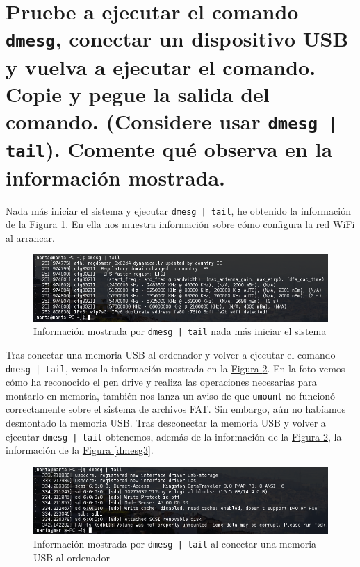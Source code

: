 \documentclass[10pt,a4paper,spanish]{article}
\numberwithin{equation}{section} %
\numberwithin{figure}{section} %
\numberwithin{table}{section} %
\begin{document}
\section{Pruebe a ejecutar el comando \texttt{dmesg}, conectar un dispositivo USB y vuelva a ejecutar el comando. Copie y pegue la salida del comando. (Considere usar \texttt{dmesg | tail}). Comente qué observa en la información mostrada.}
Nada más iniciar el sistema y ejecutar \texttt{dmesg | tail}, he obtenido la información de la \hyperref[dmesg1]{Figura \ref*{dmesg1}}. En ella nos muestra información sobre cómo configura la red WiFi al arrancar.

\begin{figure}[!h]
    \centering
    \includegraphics[width=1\textwidth]{7}
    \caption{Información mostrada por \texttt{dmesg | tail} nada más iniciar el sistema}
    \label{dmesg1}
\end{figure}

Tras conectar una memoria USB al ordenador y volver a ejecutar el comando \texttt{dmesg | tail}, vemos la información mostrada en la \hyperref[dmesg2]{Figura \ref*{dmesg2}}. En la foto vemos cómo ha reconocido el pen drive y realiza las operaciones necesarias para montarlo en memoria, también nos lanza un aviso de que \texttt{umount} no funcionó correctamente sobre el sistema de archivos FAT. Sin embargo, aún no habíamos desmontado la memoria USB. Tras desconectar la memoria USB y volver a ejecutar \texttt{dmesg | tail} obtenemos, además de la información de la \hyperref[dmesg2]{Figura \ref*{dmesg2}}, la información de la \hyperref[dmesg3]{Figura \ref*{dmesg3}}.

\begin{figure}[!h]
    \centering
    \includegraphics[width=1\textwidth]{8}
    \caption{Información mostrada por \texttt{dmesg | tail} al conectar una memoria USB al ordenador}
    \label{dmesg2}
\end{figure}
\end{document}
